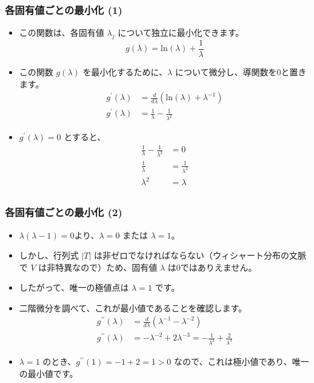 \documentclass[aspectratio=169]{beamer}
\begin{document}
\begin{frame}
\frametitle{各固有値ごとの最小化 (1)}
\begin{itemize}
    \item この関数は、各固有値 $\lambda_j$ について独立に最小化できます。
    \[ g(\lambda)=\text{ln}(\lambda)+\frac{1}{\lambda} \]
    \item この関数 $g(\lambda)$ を最小化するために、$\lambda$ について微分し、導関数を0と置きます。
    \begin{align*}
        g^{\prime}(\lambda)&=\frac{d}{d\lambda}(\text{ln}(\lambda)+\lambda^{-1}) \\
        g^{\prime}(\lambda)&=\frac{1}{\lambda}-\frac{1}{\lambda^2}
    \end{align*}
    \item $g^{\prime}(\lambda)=0$ とすると、
    \begin{align*}
        \frac{1}{\lambda}-\frac{1}{\lambda^2}&=0 \\
        \frac{1}{\lambda}&=\frac{1}{\lambda^2} \\
        \lambda^2&=\lambda \\
    \end{align*}
\end{itemize}
\end{frame}

\begin{frame}
\frametitle{各固有値ごとの最小化 (2)}
\begin{itemize}
    \item $\lambda(\lambda-1)=0$より、$\lambda=0$ または $\lambda=1$。
        \item しかし、行列式 $|T|$ は非ゼロでなければならない（ウィシャート分布の文脈で $V$ は非特異なので）ため、固有値 $\lambda$ は0ではありえません。
        \item したがって、唯一の極値点は $\lambda=1$ です。
        \item 二階微分を調べて、これが最小値であることを確認します。
        \begin{align*}
            g^{\prime\prime}(\lambda)&=\frac{d}{d\lambda}(\lambda^{-1}-\lambda^{-2}) \\
            g^{\prime\prime}(\lambda)&=-\lambda^{-2}+2\lambda^{-3}=-\frac{1}{\lambda^2}+\frac{2}{\lambda^3}
        \end{align*}
        \item $\lambda=1$ のとき、$g^{\prime\prime}(1)=-1+2=1>0$ なので、これは極小値であり、唯一の最小値です。
\end{itemize}
\end{frame}
\end{document}
